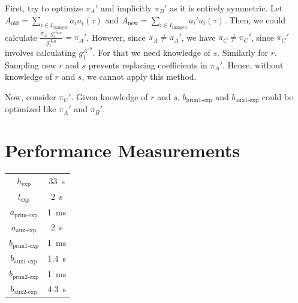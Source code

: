 \documentclass{article}
\begin{document}
First, try to optimize $\pi_A'$ and implicitly $\pi_B'$ as it is entirely symmetric.
Let $A_\text{old} = \sum_{i\in I_\text{changed}} a_i u_i(\tau)$ and $A_\text{new} = \sum_{i\in I_\text{changed}} a_i' u_i(\tau)$.
Then, we could calculate $\frac{\pi_A\cdot g_1^{A_\text{new}}}{g_1^{A_\text{old}}} = \pi_A'$.
However, since $\pi_A \neq \pi_A'$, we have $\pi_C \neq \pi_C'$, since $\pi_C'$ involves calculating ${g_1^{A'}}^s$. For that we need knowledge of $s$.
Similarly for $r$.
Sampling new $r$ and $s$ prevents replacing coefficients in $\pi_A'$.
Hence, without knowledge of $r$ and $s$, we cannot apply this method.

Now, consider $\pi_C'$.
Given knowledge of $r$ and $s$, $b_\text{prim1-exp}$ and $b_\text{aux1-exp}$ could be optimized like $\pi_A'$ and $\pi_B'$.


\section{Performance Measurements} \label{sec:benchmarks}

\begin{center}
\begin{tabular}{ c c }
        $h_\text{exp} $ & \SI{33}{\second} \\
        $l_\text{exp}$ & \SI{2}{\second} \\
        $a_\text{prim-exp}$ & \SI{1}{\milli\second} \\
        $a_\text{aux-exp}$ & \SI{2}{\second} \\
        $b_\text{prim1-exp}$ & \SI{1}{\milli\second} \\
        $b_\text{aux1-exp}$ & \SI{1.4}{\second} \\
        $b_\text{prim2-exp}$ & \SI{1}{\milli\second} \\
        $b_\text{aux2-exp}$ & \SI{4.3}{\second}
\end{tabular}
\end{center}

\end{document}
